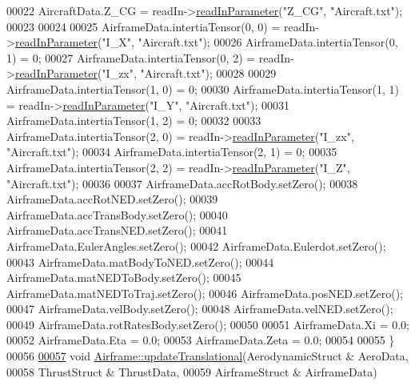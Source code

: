 \begin{DoxyCode}
00022     AircraftData.Z\_CG       = readIn->\hyperlink{classread_in_data_a9ae979e74958b43424cb6cf4a22043d7}{readInParameter}(\textcolor{stringliteral}{"Z\_CG"}, \textcolor{stringliteral}{"Aircraft.txt"});
00023 
00024 
00025     AirframeData.intertiaTensor(0, 0) = readIn->\hyperlink{classread_in_data_a9ae979e74958b43424cb6cf4a22043d7}{readInParameter}(\textcolor{stringliteral}{"I\_X"}, \textcolor{stringliteral}{"Aircraft.txt"});
00026     AirframeData.intertiaTensor(0, 1) = 0;
00027     AirframeData.intertiaTensor(0, 2) = readIn->\hyperlink{classread_in_data_a9ae979e74958b43424cb6cf4a22043d7}{readInParameter}(\textcolor{stringliteral}{"I\_zx"}, \textcolor{stringliteral}{"Aircraft.txt"});
00028 
00029     AirframeData.intertiaTensor(1, 0) = 0;
00030     AirframeData.intertiaTensor(1, 1) = readIn->\hyperlink{classread_in_data_a9ae979e74958b43424cb6cf4a22043d7}{readInParameter}(\textcolor{stringliteral}{"I\_Y"}, \textcolor{stringliteral}{"Aircraft.txt"});
00031     AirframeData.intertiaTensor(1, 2) = 0;
00032 
00033     AirframeData.intertiaTensor(2, 0) = readIn->\hyperlink{classread_in_data_a9ae979e74958b43424cb6cf4a22043d7}{readInParameter}(\textcolor{stringliteral}{"I\_zx"}, \textcolor{stringliteral}{"Aircraft.txt"});
00034     AirframeData.intertiaTensor(2, 1) = 0;
00035     AirframeData.intertiaTensor(2, 2) = readIn->\hyperlink{classread_in_data_a9ae979e74958b43424cb6cf4a22043d7}{readInParameter}(\textcolor{stringliteral}{"I\_Z"}, \textcolor{stringliteral}{"Aircraft.txt"});
00036 
00037     AirframeData.accRotBody.setZero();
00038     AirframeData.accRotNED.setZero();
00039     AirframeData.accTransBody.setZero();
00040     AirframeData.accTransNED.setZero();
00041     AirframeData.EulerAngles.setZero();
00042     AirframeData.Eulerdot.setZero();
00043     AirframeData.matBodyToNED.setZero();
00044     AirframeData.matNEDToBody.setZero();
00045     AirframeData.matNEDToTraj.setZero();
00046     AirframeData.posNED.setZero();
00047     AirframeData.velBody.setZero();
00048     AirframeData.velNED.setZero();
00049     AirframeData.rotRatesBody.setZero();
00050 
00051     AirframeData.Xi = 0.0;
00052     AirframeData.Eta = 0.0;
00053     AirframeData.Zeta = 0.0;
00054     
00055 \}
00056 
\hyperlink{group___airframe_a29b3a2854700f77468b6a94c5b7d0372}{00057} \textcolor{keywordtype}{void} \hyperlink{group___airframe_a29b3a2854700f77468b6a94c5b7d0372}{Airframe::updateTranslational}(AerodynamicStruct & AeroData, 
00058                                    ThrustStruct & ThrustData,
00059                                     AirframeStruct & AirframeData)

\end{DoxyCode}
